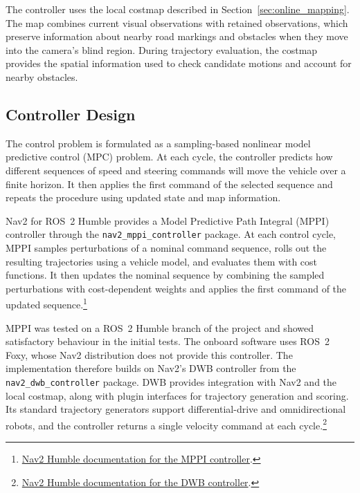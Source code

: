 \documentclass[a4paper,11pt,oneside]{book}
\begin{document}
The controller uses the local costmap described in
Section~\ref{sec:online_mapping}. The map combines current visual
observations with retained observations, which preserve information
about nearby road markings and obstacles when they move into the
camera's blind region. During trajectory evaluation, the costmap
provides the spatial information used to check candidate motions and
account for nearby obstacles.

\subsection{Controller Design}
\label{subsec:controller_design}

The control problem is formulated as a sampling-based nonlinear model
predictive control (MPC) problem. At each cycle, the controller
predicts how different sequences of speed and steering commands will
move the vehicle over a finite horizon. It then applies the first
command of the selected sequence and repeats the procedure using
updated state and map information.

Nav2 for ROS~2 Humble provides a Model Predictive Path Integral (MPPI)
controller through the \texttt{nav2\_mppi\_controller} package.
At each control cycle, MPPI samples perturbations of a nominal command
sequence, rolls out the resulting trajectories using a vehicle model,
and evaluates them with cost functions. It then updates the nominal
sequence by combining the sampled perturbations with cost-dependent
weights and applies the first command of the updated sequence.\footnote{%
    \href{https://api.nav2.org/nav2-humble/html/md_nav2_mppi_controller_README.html}
    {Nav2 Humble documentation for the MPPI controller}.}

MPPI was tested on a ROS~2 Humble branch of the project and showed
satisfactory behaviour in the initial tests. The onboard software
uses ROS~2 Foxy, whose Nav2 distribution does not provide this
controller. The implementation therefore builds on Nav2's DWB
controller from the \texttt{nav2\_dwb\_controller} package. DWB
provides integration with Nav2 and the local costmap, along with
plugin interfaces for trajectory generation and scoring. Its standard
trajectory generators support differential-drive and omnidirectional
robots, and the controller returns a single velocity command at each
cycle.\footnote{%
    \href{https://api.nav2.org/nav2-humble/html/md_nav2_dwb_controller_README.html}
    {Nav2 Humble documentation for the DWB controller}.}
\end{document}
